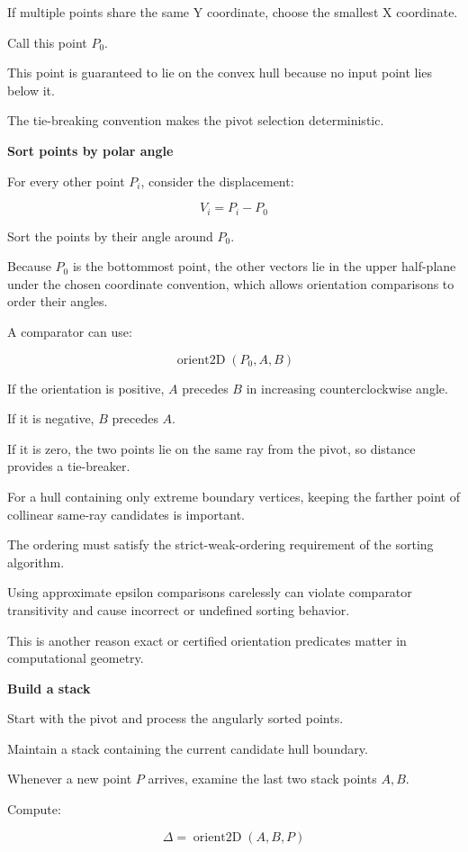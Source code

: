 If multiple points share the same Y coordinate, choose the smallest X coordinate.

Call this point \(P_0\).

This point is guaranteed to lie on the convex hull because no input point lies below it.

The tie-breaking convention makes the pivot selection deterministic.

\textbf{Sort points by polar angle}

For every other point \(P_i\), consider the displacement:

\[
V_i=P_i-P_0
\]

Sort the points by their angle around \(P_0\).

Because \(P_0\) is the bottommost point, the other vectors lie in the upper half-plane under the chosen coordinate convention, which allows orientation comparisons to order their angles.

A comparator can use:

\[
\operatorname{orient2D}(P_0,A,B)
\]

If the orientation is positive, \(A\) precedes \(B\) in increasing counterclockwise angle.

If it is negative, \(B\) precedes \(A\).

If it is zero, the two points lie on the same ray from the pivot, so distance provides a tie-breaker.

For a hull containing only extreme boundary vertices, keeping the farther point of collinear same-ray candidates is important.

The ordering must satisfy the strict-weak-ordering requirement of the sorting algorithm.

Using approximate epsilon comparisons carelessly can violate comparator transitivity and cause incorrect or undefined sorting behavior.

This is another reason exact or certified orientation predicates matter in computational geometry.

\textbf{Build a stack}

Start with the pivot and process the angularly sorted points.

Maintain a stack containing the current candidate hull boundary.

Whenever a new point \(P\) arrives, examine the last two stack points \(A,B\).

Compute:

\[
\Delta=\operatorname{orient2D}(A,B,P)
\]

